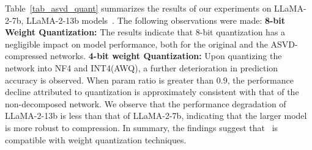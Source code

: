Table~\ref{tab_asvd_quant} summarizes the results of our experiments on LLaMA-2-7b, LLaMA-2-13b models~\citep{touvron2023llama2}. The following observations were made: \textbf{8-bit Weight Quantization:} The results indicate that 8-bit quantization has a negligible impact on model performance, both for the original and the ASVD-compressed networks. 
\textbf{4-bit weight Quantization:} Upon quantizing the network into NF4 and INT4(AWQ), a further deterioration in prediction accuracy is observed. When param ratio is greater than 0.9, the performance decline attributed to quantization is approximately consistent with that of the non-decomposed network. 
We observe that the performance degradation of LLaMA-2-13b is less than that of LLaMA-2-7b, indicating that the larger model is more robust to compression.
In summary, the findings suggest that \asvd~is compatible with weight quantization techniques.






